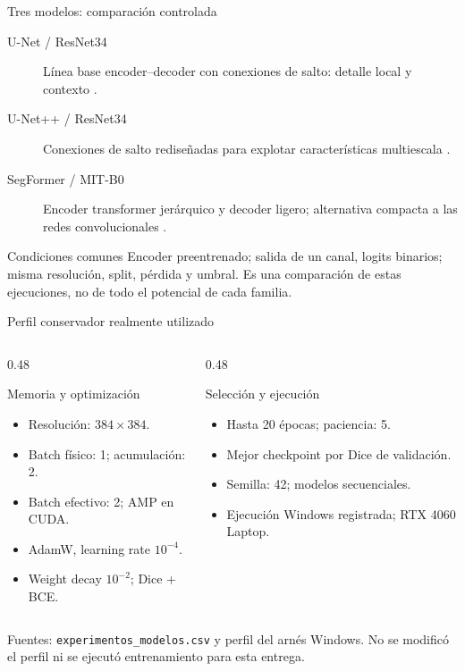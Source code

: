\documentclass[aspectratio=169,11pt]{beamer}
\begin{document}
\begin{frame}{Tres modelos: comparación controlada}
  \begin{description}
    \item[U-Net / ResNet34] Línea base encoder--decoder con conexiones de salto:
      detalle local y contexto \cite{unet}.
    \item[U-Net++ / ResNet34] Conexiones de salto rediseñadas para explotar
      características multiescala \cite{unetpp}.
    \item[SegFormer / MIT-B0] Encoder transformer jerárquico y decoder ligero;
      alternativa compacta a las redes convolucionales \cite{segformer}.
  \end{description}
  \begin{block}{Condiciones comunes}
    Encoder preentrenado; salida de un canal, logits binarios;
    misma resolución, split, pérdida y umbral.
    Es una comparación de estas ejecuciones, no de todo el potencial de cada familia.
  \end{block}
\end{frame}

\begin{frame}{Perfil conservador realmente utilizado}
  \begin{columns}[T]
    \begin{column}{0.48\textwidth}
      \begin{block}{Memoria y optimización}
        \begin{itemize}
          \item Resolución: $384\times384$.
          \item Batch físico: 1; acumulación: 2.
          \item Batch efectivo: 2; AMP en CUDA.
          \item AdamW, learning rate $10^{-4}$.
          \item Weight decay $10^{-2}$; Dice + BCE.
        \end{itemize}
      \end{block}
    \end{column}
    \begin{column}{0.48\textwidth}
      \begin{block}{Selección y ejecución}
        \begin{itemize}
          \item Hasta 20 épocas; paciencia: 5.
          \item Mejor checkpoint por Dice de validación.
          \item Semilla: 42; modelos secuenciales.
          \item Ejecución Windows registrada; RTX 4060 Laptop.
        \end{itemize}
      \end{block}
    \end{column}
  \end{columns}
  \small Fuentes: \texttt{experimentos\_modelos.csv} y perfil del arnés Windows.
  No se modificó el perfil ni se ejecutó entrenamiento para esta entrega.
\end{frame}
\end{document}

